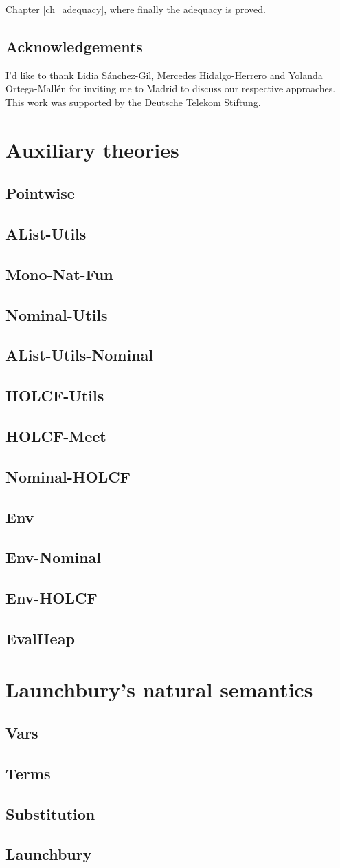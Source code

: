 \documentclass[11pt,a4paper,parskip=half]{scrartcl}
\begin{document}
Chapter \ref{ch_adequacy}, where finally the adequacy is proved.

%
%

\subsection{Acknowledgements}


I’d like to thank Lidia Sánchez-Gil, Mercedes Hidalgo-Herrero and Yolanda Ortega-Mallén for inviting me to Madrid to discuss our respective approaches.\\
This work was supported by the Deutsche Telekom Stiftung.

\clearpage
\newcommand{\theory}[1]{\subsection{#1}\label{sec_#1}}

\section{Auxiliary theories}
\label{ch_aux}

\theory{Pointwise}
\theory{AList-Utils}
\theory{Mono-Nat-Fun}

\theory{Nominal-Utils}
\theory{AList-Utils-Nominal}

\theory{HOLCF-Utils}
\theory{HOLCF-Meet}
\theory{Nominal-HOLCF}


\theory{Env}
\theory{Env-Nominal}
\theory{Env-HOLCF}
\theory{EvalHeap}


\clearpage
\section{Launchbury's natural semantics}
\label{ch_natsem}

\theory{Vars}
\theory{Terms}
\theory{Substitution}
\theory{Launchbury}
\end{document}
